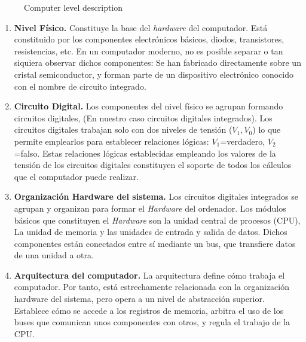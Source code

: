 \begin{paracol}{2}
\begin{figure}[h]
	\renewcommand{\figurename}{Figure}
	\caption{Computer level description}
	\label{fig:nivel}
\end{figure}
\switchcolumn
\begin{enumerate}
\item \textbf{Nivel Físico.} Constituye la base del \emph{hardware} del computador. Está constituido por los componentes electrónicos básicos, diodos, transistores, resistencias, etc.  En un computador moderno, no es posible separar o tan siquiera observar dichos componentes: Se han fabricado directamente sobre un cristal semiconductor, y forman parte de un dispositivo electrónico conocido con el nombre de circuito integrado.

\item \textbf{Circuito Digital.}
Los componentes del nivel físico se agrupan formando circuitos digitales, (En nuestro caso circuitos digitales integrados). Los circuitos digitales trabajan solo con dos niveles de tensión ($V_1, V_0$) lo que permite emplearlos para establecer relaciones lógicas: $V_1$=verdadero, $V_2$=falso. Estas relaciones lógicas establecidas empleando los valores de la tensión de los circuitos digitales constituyen el soporte de todos los cálculos que el computador puede realizar.

\item \textbf{Organización Hardware del sistema.} 
Los circuitos digitales integrados se agrupan y organizan para formar el \emph{Hardware} del ordenador.  Los módulos básicos que constituyen el \emph{Hardware} son la unidad central de procesos (CPU), La unidad de memoria y las unidades de entrada y salida de datos. Dichos componentes están conectados entre sí mediante un bus, que transfiere datos de una unidad a otra.

\item \textbf{Arquitectura del computador.} 
La arquitectura define cómo trabaja el computador. Por tanto, está estrechamente relacionada con la organización hardware del sistema, pero opera a un nivel de abstracción superior. Establece cómo se accede a los registros de memoria, arbitra el uso de los buses que comunican unos componentes con otros, y regula el trabajo de la CPU.  


\end{enumerate}
\end{paracol}
